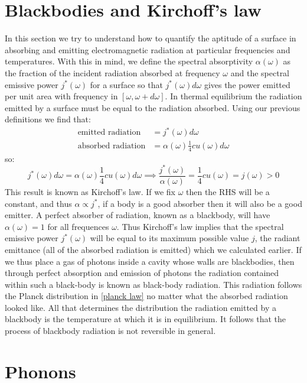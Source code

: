 \documentclass[a4paper,11pt,oneside]{book}
\begin{document}
\section{Blackbodies and Kirchoff's law}
In this section we try to understand how to quantify the aptitude of a surface in absorbing and emitting electromagnetic radiation at particular frequencies and temperatures. With this in mind, we define the spectral absorptivity $\alpha(\omega)$ as the fraction of the incident radiation absorbed at frequency $\omega$ and the spectral emissive power $j^*(\omega)$ for a surface so that $j^*(\omega) d\omega$ gives the power emitted per unit area with frequency in $[\omega,\omega+d\omega]$. In thermal equilibrium the radiation emitted by a surface must be equal to the radiation absorbed. Using our previous definitions we find that:
\begin{align}
    \text{emitted radiation} &= j^*(\omega) d\omega \\
    \text{absorbed radiation} &= \alpha(\omega) \frac{1}{4}cu(\omega)d\omega
\end{align}
so:
\begin{equation}
    j^*(\omega) d\omega = \alpha(\omega) \frac{1}{4}cu(\omega)d\omega \implies \boxed{\frac{j^*(\omega)}{\alpha(\omega)} = \frac{1}{4}cu(\omega) = j(\omega)>0}
\end{equation}
This result is known as Kirchoff's law. If we fix $\omega$ then the RHS will be a constant, and thus $\alpha \propto j^*$, if a body is a good absorber then it will also be a good emitter. A perfect absorber of radiation, known as a blackbody, will have $\alpha(\omega)=1$ for all frequences $\omega$. Thus Kirchoff's law implies that the spectral emissive power $j^*(\omega)$ will be equal to its maximum possible value $j$, the radiant emittance (all of the absorbed radiation is emitted) which we calculated earlier. If we thus place a gas of photons inside a cavity whose walls are blackbodies, then through perfect absorption and emission of photons the radiation contained within such a black-body is known as black-body radiation. This radiation follows the Planck distribution in \eqref{planck law} no matter what the absorbed radiation looked like. All that determines the distribution the radiation emitted by a blackbody is the temperature at which it is in equilibrium. It follows that the process of blackbody radiation is not reversible in general.
\section{Phonons}
\end{document}
